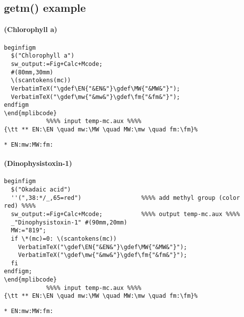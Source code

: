 \documentclass[a4paper]{article}
\begin{document}
\subsection{getm() example}
\paragraph{(Chlorophyll a)}
\noindent%
\begin{verbatim}
beginfigm
  $("Chlorophyll a")
  sw_output:=Fig+Calc+Mcode;
  #(80mm,30mm)
  \(scantokens(mc))
  VerbatimTeX("\gdef\EN{"&EN&"}\gdef\MW{"&MW&"}");
  VerbatimTeX("\gdef\mw{"&mw&"}\gdef\fm{"&fm&"}");
endfigm
\end{mplibcode}
            %%%% input temp-mc.aux %%%%
{\tt ** EN:\EN \quad mw:\MW \quad MW:\mw \quad fm:\fm}%
\end{verbatim}
{\tt ** EN:\EN \quad mw:\MW \quad MW:\mw \quad fm:\fm}%
\paragraph{(Dinophysistoxin-1)}
\noindent%
\begin{verbatim}
beginfigm
  $("Okadaic acid")
  ''(",38:*/_,65=red")                 %%%% add methyl group (color red) %%%%
  sw_output:=Fig+Calc+Mcode;           %%%% output temp-mc.aux %%%%
  _"Dinophysistoxin-1" #(90mm,20mm)
  MW:="819";
  if \*(mc)=0: \(scantokens(mc))
    VerbatimTeX("\gdef\EN{"&EN&"}\gdef\MW{"&MW&"}");
    VerbatimTeX("\gdef\mw{"&mw&"}\gdef\fm{"&fm&"}");
  fi
endfigm;
\end{mplibcode}
            %%%% input temp-mc.aux %%%%
{\tt ** EN:\EN \quad mw:\MW \quad MW:\mw \quad fm:\fm}%
\end{verbatim}
{\tt ** EN:\EN \quad mw:\MW \quad MW:\mw \quad fm:\fm}%
\newpage
\end{document}
